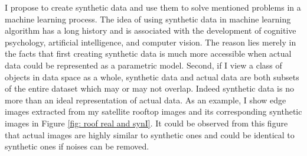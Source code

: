 \documentclass{iitthesis}
\begin{document}
I propose to create synthetic data and use them to solve mentioned problems in a machine learning process. The idea of using synthetic data in machine learning algorithm has a long history and is associated with the development of cognitive psychology, artificial intelligence, and computer vision. The reason lies merely in the facts that first creating synthetic data is much more accessible when actual data could be represented as a parametric model. Second, if I view a class of objects in data space as a whole, synthetic data and actual data are both subsets of the entire dataset which may or may not overlap. Indeed synthetic data is no more than an ideal representation of actual data. As an example, I show edge images extracted from my satellite rooftop images and its corresponding synthetic images in Figure \ref{fig: roof real and synI}. It could be observed from this figure that actual images are highly similar to synthetic ones and could be identical to synthetic ones if noises can be removed.

 \label{dataspace: relatedwork}
\end{document}
